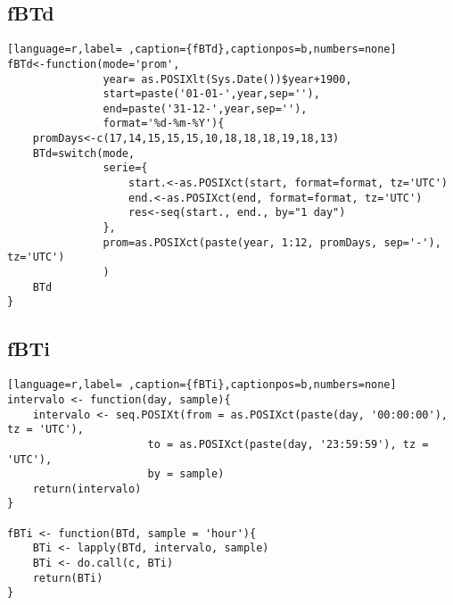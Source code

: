 \subsection{fBTd}
\label{sec:org50f11ce}
\label{subsec:fbtd}
\begin{lstlisting}[language=r,label= ,caption={fBTd},captionpos=b,numbers=none]
fBTd<-function(mode='prom',
               year= as.POSIXlt(Sys.Date())$year+1900,
               start=paste('01-01-',year,sep=''),
               end=paste('31-12-',year,sep=''), 
               format='%d-%m-%Y'){
    promDays<-c(17,14,15,15,15,10,18,18,18,19,18,13)
    BTd=switch(mode,
               serie={
                   start.<-as.POSIXct(start, format=format, tz='UTC')
                   end.<-as.POSIXct(end, format=format, tz='UTC')
                   res<-seq(start., end., by="1 day")
               },
               prom=as.POSIXct(paste(year, 1:12, promDays, sep='-'), tz='UTC')
               )
    BTd
}
\end{lstlisting}
\subsection{fBTi}
\label{sec:orgd723e29}
\label{subsec:fbti}
\begin{lstlisting}[language=r,label= ,caption={fBTi},captionpos=b,numbers=none]
intervalo <- function(day, sample){
    intervalo <- seq.POSIXt(from = as.POSIXct(paste(day, '00:00:00'), tz = 'UTC'),
                      to = as.POSIXct(paste(day, '23:59:59'), tz = 'UTC'),
                      by = sample)
    return(intervalo)
}

fBTi <- function(BTd, sample = 'hour'){
    BTi <- lapply(BTd, intervalo, sample)
    BTi <- do.call(c, BTi)
    return(BTi)
}
\end{lstlisting}
